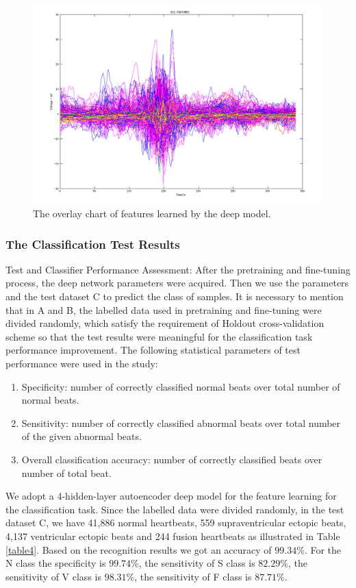 \documentclass[journal]{IEEEtran}
\begin{document}
\begin{figure}[]
\centering
\includegraphics[width=3.5 in]{eps/features.png}
\caption{The overlay chart of features learned by the deep model.}
\label{figure4}
\end{figure}



\subsubsection{The Classification Test Results}
Test and Classifier Performance Assessment: After the pretraining and fine-tuning process, the deep network parameters were acquired. Then we use the parameters and the test dataset C to predict the class of samples. It is necessary to mention that in A and B, the labelled data used in pretraining and fine-tuning were divided randomly, which satisfy the requirement of Holdout cross-validation scheme so that the test results were meaningful for the classification task performance improvement.
The following statistical parameters of test performance were used in the study:
\begin{enumerate}
\item Specificity: number of correctly classified normal beats over total number of normal beats.
\item Sensitivity: number of correctly classified abnormal beats over total number of the given abnormal beats.
\item Overall classification accuracy: number of correctly classified beats over number of total beat.
\end{enumerate}

We adopt a 4-hidden-layer autoencoder deep model for the feature learning for the classification task. Since the labelled data were divided randomly, in the test dataset C, we have 41,886 normal heartbeats, 559 supraventricular ectopic beats, 4,137 ventricular ectopic beats and 244 fusion heartbeats as illustrated in Table \ref{table4}. Based on the recognition results we got an accuracy of $99.34\%$. For the N class the specificity is $99.74\%$, the sensitivity of S class is $82.29\%$, the sensitivity of V class is $98.31\%$, the sensitivity of F class is $87.71\%$.
\end{document}
